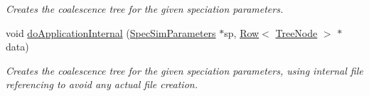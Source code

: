 \begin{DoxyCompactItemize}
\begin{DoxyCompactList}\small\item\em Creates the coalescence tree for the given speciation parameters. \end{DoxyCompactList}\item 
void \hyperlink{group___community_objects_aee7488d02cccb897ed1d561e242391df}{do\+Application\+Internal} (\hyperlink{struct_spec_sim_parameters}{Spec\+Sim\+Parameters} $\ast$sp, \hyperlink{class_row}{Row}$<$ \hyperlink{class_tree_node}{Tree\+Node} $>$ $\ast$data)
\begin{DoxyCompactList}\small\item\em Creates the coalescence tree for the given speciation parameters, using internal file referencing to avoid any actual file creation. \end{DoxyCompactList}\end{DoxyCompactItemize}
